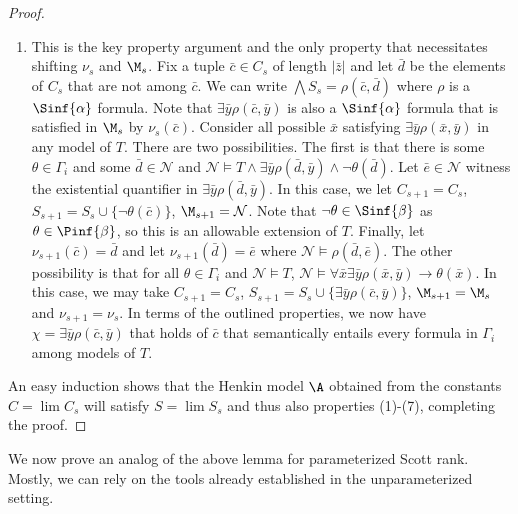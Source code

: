 \documentclass{amsart}
\renewcommand{\-}{\text{-}}
\begin{document}
\begin{proof}
\begin{enumerate}[align=left,leftmargin=\parindent]
			Given $\varphi_i$ and $\bar{c}\in C_s$ of the appropriate length $S_{s+1}=S_s\cup\{\varphi_i(\bar{c})\}$, $\M_{s+1}=\M_s$, $C_{s+1}=C_s$ and $\nu_{s+1}=\nu_s$.
			\item[Property $(7)$]
			This is the key property argument and the only property that necessitates shifting $\nu_s$ and $\M_s$.
			Fix a tuple  $\bar{c}\in C_s$ of length $\vert \bar{z} \vert$ and let $\bar{d}$ be the elements of $C_s$ that are not among $\bar{c}$.
			We can write $\bigwedge S_s=\rho(\bar{c},\bar{d})$ where $\rho$ is a $\Sinf{\alpha}$ formula.
			Note that $\exists\bar{y}\rho(\bar{c},\bar{y})$ is also a $\Sinf{\alpha}$ formula that is satisfied in $\M_s$ by $\nu_s(\bar{c})$.
			Consider all possible $\bar{x}$ satisfying $\exists\bar{y}\rho(\bar{x},\bar{y})$ in any model of $T$.
			There are two possibilities.
			The first is that there is some $\theta\in\Gamma_i$ and some $\bar{d}\in \mathcal{N}$ and $\mathcal{N}\models T \land \exists\bar{y}\rho(\bar{d},\bar{y})\land \lnot \theta(\bar{d})$.
			Let $\bar e\in \mathcal{N}$ witness the existential quantifier in $\exists\bar{y}\rho(\bar{d},\bar{y})$.
			In this case, we let $C_{s+1}=C_s$, $S_{s+1}=S_s\cup\{\lnot\theta(\bar{c})\}$, $\M_{s+1}=\mathcal{N}$.
			Note that $\lnot\theta\in \Sinf{\beta}$ as $\theta\in \Pinf{\beta}$, so this is an allowable extension of $T$.
			Finally, let $\nu_{s+1}(\bar{c})=\bar{d}$ and let $\nu_{s+1}(\bar{d})=\bar{e}$ where $\mathcal{N}\models \rho(\bar{d},\bar{e})$.
			The other possibility is that for all $\theta\in\Gamma_i$ and $\mathcal{N}\models T$, $\mathcal{N}\models \forall \bar x\exists\bar{y}\rho(\bar{x},\bar{y})\to\theta(\bar{x})$.
			In this case, we may take $C_{s+1}=C_s$, $S_{s+1}=S_s\cup\{\exists\bar{y}\rho(\bar{c},\bar{y})\}$, $\M_{s+1}=\M_s$ and $\nu_{s+1}=\nu_s$.
			In terms of the outlined properties, we now have $\chi=\exists\bar{y}\rho(\bar{c},\bar{y})$ that holds of $\bar{c}$ that semantically entails every formula in $\Gamma_i$ among models of $T$.
		\end{enumerate}
		
		An easy induction shows that the Henkin model $\A$ obtained from the constants $C=\lim C_s$ will satisfy $S=\lim S_s$ and thus also properties (1)-(7), completing the proof.

\end{proof}

We now prove an analog of the above lemma for parameterized Scott rank.
Mostly, we can rely on the tools already established in the unparameterized setting.
\end{document}

